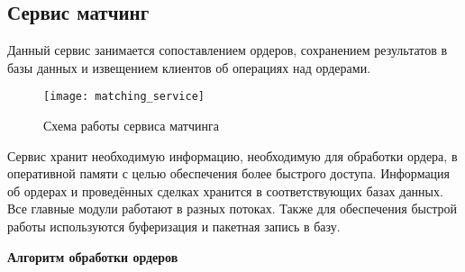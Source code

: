 \subsection{Сервис матчинг}\label{sec:development:matching}

Данный сервис занимается сопоставлением ордеров, сохранением результатов в базы данных и извещением клиентов об операциях над ордерами.

\begin{figure}[ht]
    \centering
    \texttt{[image: matching\_service]}
    \caption{Схема работы сервиса матчинга}\label{fig:matching_service}
\end{figure}

Сервис хранит необходимую информацию, необходимую для обработки ордера, в оперативной памяти с целью обеспечения более быстрого доступа.
Информация об ордерах и проведённых сделках хранится в соответствующих базах данных.
Все главные модули работают в разных потоках.
Также для обеспечения быстрой работы используются буферизация и пакетная запись в базу.

\textbf{Алгоритм обработки ордеров}

